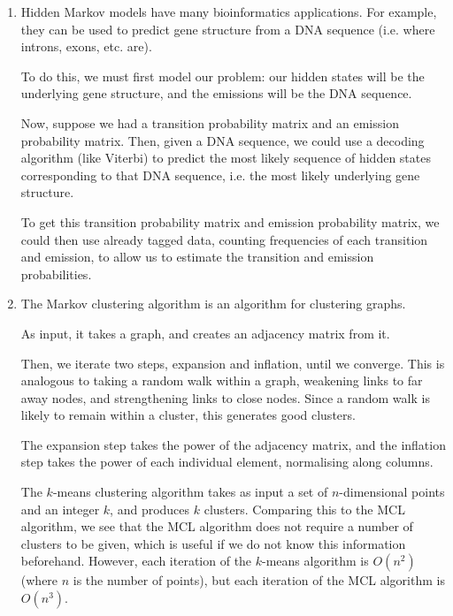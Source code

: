 


\begin{enumerate}[label=(\alph*)]

  \item
    Hidden Markov models have many bioinformatics applications. For example, they can be used to predict gene structure from a DNA sequence (i.e. where introns, exons, etc. are).

    To do this, we must first model our problem: our hidden states will be the underlying gene structure, and the emissions will be the DNA sequence.

    Now, suppose we had a transition probability matrix and an emission probability matrix. Then, given a DNA sequence, we could use a decoding algorithm (like Viterbi) to predict the most likely sequence of hidden states corresponding to that DNA sequence, i.e. the most likely underlying gene structure.

    To get this transition probability matrix and emission probability matrix, we could then use already tagged data, counting frequencies of each transition and emission, to allow us to estimate the transition and emission probabilities.

    \item
      The Markov clustering algorithm is an algorithm for clustering graphs.

      As input, it takes a graph, and creates an adjacency matrix from it.

      Then, we iterate two steps, expansion and inflation, until we converge. This is analogous to taking a random walk within a graph, weakening links to far away nodes, and strengthening links to close nodes. Since a random walk is likely to remain within a cluster, this generates good clusters.

      The expansion step takes the power of the adjacency matrix, and the inflation step takes the power of each individual element, normalising along columns.

      The $k$-means clustering algorithm takes as input a set of $n$-dimensional points and an integer $k$, and produces $k$ clusters. Comparing this to the MCL algorithm, we see that the MCL algorithm does not require a number of clusters to be given, which is useful if we do not know this information beforehand. However, each iteration of the $k$-means algorithm is $O(n^2)$ (where $n$ is the number of points), but each iteration of the MCL algorithm is $O(n^3)$.


\end{enumerate}
